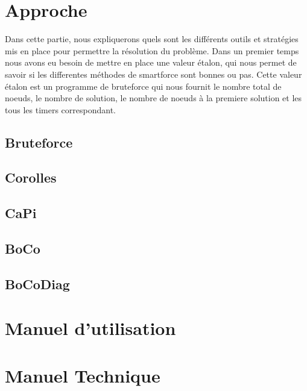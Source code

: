 \documentclass{article}
\begin{document}
	\section{Approche}

	Dans cette partie, nous expliquerons quels sont les différents outils et stratégies mis en place pour permettre la résolution du problème.
	Dans un premier temps nous avons eu besoin de mettre en place une valeur étalon, qui nous permet de savoir si les differentes méthodes de smartforce sont bonnes ou pas. Cette valeur étalon est un programme de bruteforce qui nous fournit le nombre total de noeuds, le nombre de solution, le nombre de noeuds à la premiere solution et les tous les timers correspondant.
	
	\subsection{Bruteforce}
	
	\subsection{Corolles}
	
	\subsection{CaPi}
	
	\subsection{BoCo}
	
	\subsection{BoCoDiag}
	
	\section{Manuel d'utilisation}
	
	\section{Manuel Technique}
\end{document}
